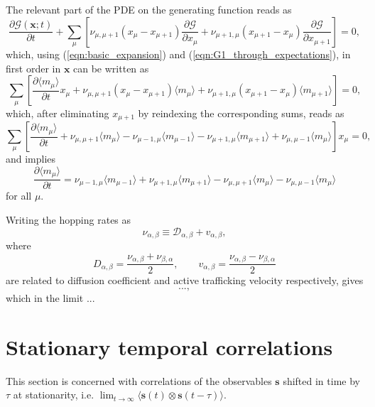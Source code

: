 \documentclass[a4paper, 11pt]{article}
\begin{document}
The relevant part of the PDE on the generating function reads as
\begin{equation*}
  \frac{\partial\mathcal G(\mathbf x; t)}{\partial t} + \sum_\mu\left[\nu_{\mu, \mu+1}(x_\mu - x_{\mu+1})\frac{\partial\mathcal G}{\partial x_\mu} + \nu_{\mu+1,\mu}(x_{\mu+1} - x_\mu)\frac{\partial\mathcal G}{\partial x_{\mu+1}}\right] = 0,
\end{equation*}
which, using (\ref{eqn:basic_expansion}) and (\ref{eqn:G1_through_expectations}), in first order in $\mathbf x$ can be written as
\begin{equation*}
  \sum_\mu\left[\frac{\partial\langle m_\mu \rangle}{\partial t}x_\mu + \nu_{\mu, \mu+1}(x_\mu - x_{\mu+1})\langle m_\mu\rangle + \nu_{\mu+1,\mu}(x_{\mu+1} - x_\mu)\langle m_{\mu+1}\rangle\right] = 0,
\end{equation*}
which, after eliminating $x_{\mu+1}$ by reindexing the corresponding sums, reads as
\begin{equation}
  \sum_\mu\left[\frac{\partial\langle m_\mu \rangle}{\partial t} + \nu_{\mu,\mu+1}\langle m_\mu\rangle - \nu_{\mu-1,\mu}\langle m_{\mu-1}\rangle - \nu_{\mu+1,\mu} \langle m_{\mu+1}\rangle + \nu_{\mu,\mu-1}\langle m_\mu\rangle \right]x_\mu = 0,
\end{equation}
and implies
\begin{equation}
  \frac{\partial\langle m_\mu \rangle}{\partial t} = \nu_{\mu-1,\mu}\langle m_{\mu-1}\rangle + \nu_{\mu+1,\mu} \langle m_{\mu+1}\rangle - \nu_{\mu,\mu+1}\langle m_\mu\rangle - \nu_{\mu,\mu-1}\langle m_\mu\rangle
\end{equation}
for all $\mu$.

Writing the hopping rates as
\begin{equation*}
  \nu_{\alpha,\beta} \equiv \mathcal D_{\alpha,\beta} + v_{\alpha,\beta},
\end{equation*}
where
\begin{equation*}
  D_{\alpha,\beta} = \frac{\nu_{\alpha,\beta} + \nu_{\beta,\alpha}}{2}, \qquad v_{\alpha,\beta} = \frac{\nu_{\alpha,\beta} - \nu_{\beta,\alpha}}{2}
\end{equation*}
are related to diffusion coefficient and active trafficking velocity respectively, gives
\begin{equation}
  ...,
\end{equation}
which in the limit ...

\section{Stationary temporal correlations}
This section is concerned with correlations of the observables $\mathbf s $ shifted in time by $\tau$ at stationarity, i.e. $\lim_{t\to\infty}\langle\mathbf{ s }(t)\otimes\mathbf{ s }(t-\tau)\rangle$.
\end{document}
